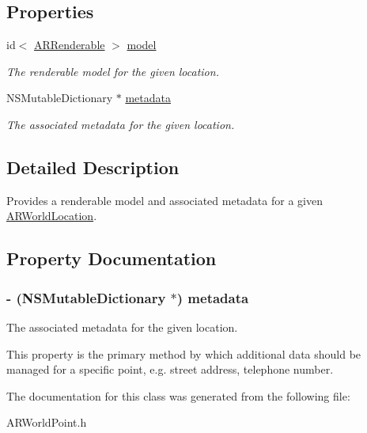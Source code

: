 \subsection*{\-Properties}
\begin{DoxyCompactItemize}
\item 
\hypertarget{interface_a_r_world_point_a31c4c5837e58a5d02fc59c370c9138b9}{
id$<$ \hyperlink{protocol_a_r_renderable-p}{\-A\-R\-Renderable} $>$ \hyperlink{interface_a_r_world_point_a31c4c5837e58a5d02fc59c370c9138b9}{model}}
\label{interface_a_r_world_point_a31c4c5837e58a5d02fc59c370c9138b9}

\begin{DoxyCompactList}\small\item\em \-The renderable model for the given location. \end{DoxyCompactList}\item 
\-N\-S\-Mutable\-Dictionary $\ast$ \hyperlink{interface_a_r_world_point_a25146859c4e3ab1a0bf9ba74e3fdb763}{metadata}
\begin{DoxyCompactList}\small\item\em \-The associated metadata for the given location. \end{DoxyCompactList}\end{DoxyCompactItemize}


\subsection{\-Detailed \-Description}
\-Provides a renderable model and associated metadata for a given \hyperlink{interface_a_r_world_location}{\-A\-R\-World\-Location}. 

\subsection{\-Property \-Documentation}
\hypertarget{interface_a_r_world_point_a25146859c4e3ab1a0bf9ba74e3fdb763}{
\subsubsection[{metadata}]{\setlength{\rightskip}{0pt plus 5cm}-\/ (\-N\-S\-Mutable\-Dictionary $\ast$) metadata}}
\label{interface_a_r_world_point_a25146859c4e3ab1a0bf9ba74e3fdb763}


\-The associated metadata for the given location. 

\-This property is the primary method by which additional data should be managed for a specific point, e.\-g. street address, telephone number. 

\-The documentation for this class was generated from the following file\-:\begin{DoxyCompactItemize}
\item 
\-A\-R\-World\-Point.\-h\end{DoxyCompactItemize}
